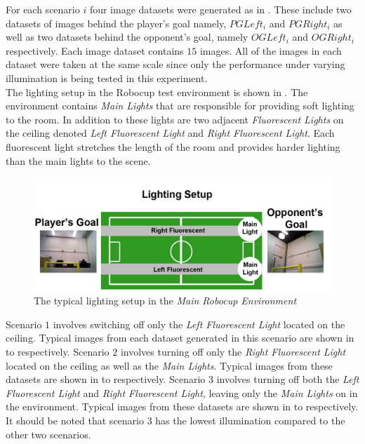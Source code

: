 \documentclass[11pt]{report}
\begin{document}
For each scenario $i$ four image datasets were generated as in . These include  two datasets of images behind the player's goal namely, \textit{$PG Left_{i}$} and \textit{$PG Right_i$} as well as two datasets behind the opponent's goal, namely \textit{$OG Left_i$} and \textit{$OG Right_i$} respectively. Each image dataset contains $15$ images. All of the images in each dataset were taken at the same scale since only the performance under varying illumination is being tested in this experiment.\\ 

The lighting setup in the Robocup test environment is shown in  . The environment contains \textit{Main Lights} that are responsible for providing soft lighting to the room. In addition to these lights are two adjacent \textit{Fluorescent Lights} on the ceiling denoted \textit{Left Fluorescent Light} and \textit{Right Fluorescent Light}. Each fluorescent light stretches the length of the room and provides harder lighting than the main lights to the scene. \\

\begin{figure}[h!] 
  \centering
    \includegraphics[width=1.0\textwidth]{../Drawings/lighting/LightingSetup.jpg}
    \caption{The typical lighting setup in the \textit{Main Robocup Environment}}
    \label{fig:lighting_setup}
\end{figure}


Scenario $1$ involves switching off only the \textit{Left Fluorescent Light} located on the ceiling. Typical images from each dataset generated in this scenario are shown in  to  respectively. Scenario $2$ involves turning off only the \textit{Right Fluorescent Light} located on the ceiling as well as the \textit{Main Lights}. Typical images from these datasets are shown in  to  respectively. Scenario $3$ involves turning off both the \textit{Left Fluorescent Light} and \textit{Right Fluorescent Light}, leaving only the \textit{Main Lights} on in the environment. Typical images from these datasets are shown in  to  respectively. It should be noted that scenario $3$ has the lowest illumination compared to the other two scenarios. \\
\end{document}
